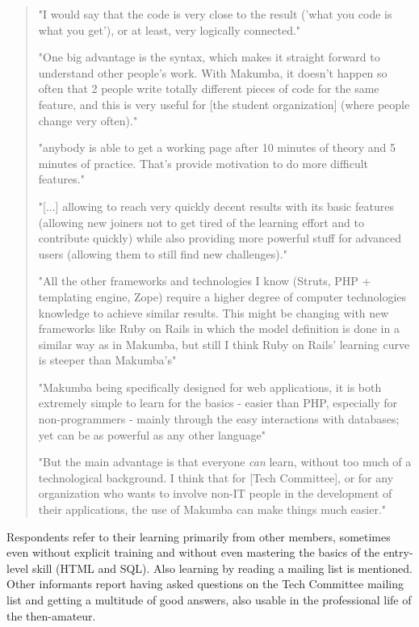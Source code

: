 \documentclass{sig-alt-release2}
\begin{document}
\begin{quotation}
 	"I would say that the code is very close to the result ('what you code is what you get'), or at least, very logically connected."

	"One big advantage is the syntax, which makes it straight forward to understand other people's work. With Makumba, it doesn't happen so often that 2 people write totally different pieces of code for the same feature, and this is very useful for [the student organization] (where people change very often)."

	 "anybody is able to get a working page after 10 minutes of theory and 5 minutes of practice. That's provide motivation to do more difficult features."

	"[...] allowing to reach very quickly decent results with its basic features (allowing new joiners not to get tired of the learning effort and to contribute quickly) while also providing more powerful stuff for advanced users (allowing them to still find new challenges)."
	
	"All the other frameworks and technologies I know (Struts, PHP + templating engine, Zope) require a higher degree of computer technologies knowledge to achieve similar results. This might be changing with new frameworks like Ruby on Rails in which the model definition is done in a similar way as in Makumba, but still I think Ruby on Rails' learning curve is steeper than Makumba's"
		
	"Makumba being specifically designed for web applications, it is both extremely simple to learn for the basics - easier than PHP, especially for non-programmers - mainly through the easy interactions with databases; yet can be as powerful as any other language"
	
	"But the main advantage is that everyone \textit{can} learn, without too much of a technological background. I think that for [Tech Committee], or for any organization who wants to involve non-IT people in the development of their applications, the use of Makumba can make things much easier."

\end{quotation}


Respondents refer to their learning primarily from other members, sometimes even without explicit training and without even mastering the basics of the entry-level skill (HTML and SQL). Also learning by reading a mailing list is mentioned. Other informants report having asked questions on the Tech Committee mailing list and getting a multitude of good answers, also usable in the professional life of the then-amateur.
\end{document}
